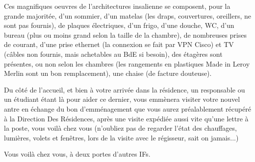 Ces magnifiques oeuvres de l'architectures insalienne se composent, pour la
grande majoritée, d'un sommier, d'un matelas (les draps, couvertures,
oreillers, ne sont pas fournis), de plaques électriques, d'un frigo,
d'une douche, WC, d'un bureau (plus ou moins grand selon la taille de la
chambre), de nombreuses prises de courant, d'une prise ethernet (la
connexion se fait par VPN Cisco) et TV (câbles non fournis, mais
achetables au BdE si besoin), des étagères sont présentes, ou
non selon les chambres (les rangements en plastiques Made in Leroy Merlin sont
un bon remplacement), une chaise (de facture douteuse).

Du côté de l'accueil, et bien à votre arrivée dans la résidence, un responsable
ou un étudiant étant là pour aider ce dernier, vous emmènera visiter votre
nouvel antre en échange du bon d'emménagement que vous aurez préalablement
récupéré à la Direction Des Résidences, après une visite expédiée aussi vite
qu'une lettre à la poste, vous voilà chez vous (n'oubliez pas de regarder
l'état des chauffages, lumières, volets et fenêtres, lors de la visite
avec le régisseur, sait on jamais...)

Vous voilà chez vous, à deux portes d'autres IFs.
